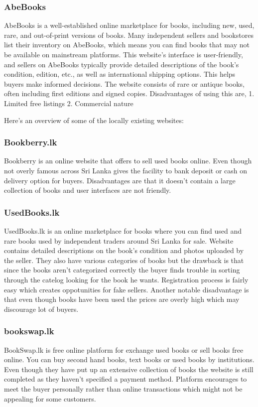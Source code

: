 \subsubsection{AbeBooks}
AbeBooks is a well-established online marketplace for books, including new,
used, rare, and out-of-print versions of books. Many independent sellers and
bookstores list their inventory on AbeBooks, which means you can find books
that may not be available on mainstream platforms. This website's interface is
user-friendly, and sellers on AbeBooks typically provide detailed descriptions
of the book's condition, edition, etc., as well as international shipping
options. This helps buyers make informed decisions. The website consists of
rare or antique books, often including first editions and signed copies.
Disadvantages of using this are, 1. Limited free listings 2. Commercial nature

Here's an overview of some of the locally existing websites:

\subsubsection{Bookberry.lk}
Bookberry is an online website that offers to sell used books online. Even
though not overly famous across Sri Lanka gives the facility to bank deposit or
cash on delivery option for buyers. Disadvantages are that it doesn't contain a
large collection of books and user interfaces are not friendly.

\subsubsection{UsedBooks.lk}
UsedBooks.lk is an online marketplace for books where you can find used and
rare books used by independent traders around Sri Lanka for sale. Website
contains detailed descriptions on the book's condition and photos uploaded by
the seller. They also have various categories of books but the drawback is that
since the books aren't categorized correctly the buyer finds trouble in sorting
through the catelog looking for the book he wants. Registration process is
fairly easy which creates oppotunities for fake sellers. Another notable
disadvantage is that even though books have been used the prices are overly
high which may discourage lot of buyers.

\subsubsection{bookswap.lk}
BookSwap.lk is free online platform for exchange used books or sell books free
online. You can buy second hand books, text books or used books by
institutions. Even though they have put up an extensive collection of books the
website is still completed as they haven't specified a payment method. Platform
encourages to meet the buyer personally rather than online transactions which
might not be appealing for some customers.